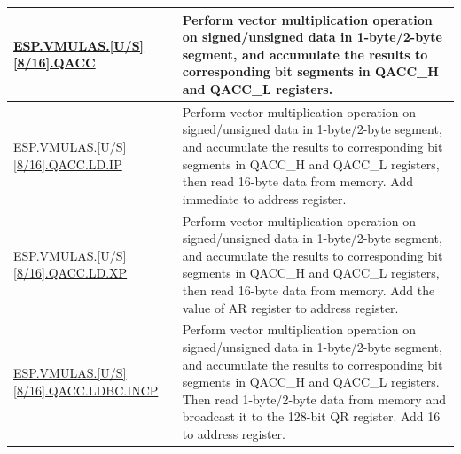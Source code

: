 \begin{longtable}[c]{|l|m{9cm}|}
    \hyperref[instruction:ESPVMULASU8QACC]{ESP.VMULAS.[U/S][8/16].QACC} & Perform vector multiplication operation on signed/unsigned data in 1-byte/2-byte segment, and accumulate the results to corresponding bit segments in QACC\_H and QACC\_L registers.
    \\\hline
    \hyperref[instruction:ESPVMULASU8QACCLDIP]{ESP.VMULAS.[U/S][8/16].QACC.LD.IP} & Perform vector multiplication operation on signed/unsigned data in 1-byte/2-byte segment, and accumulate the results to corresponding bit segments in QACC\_H and QACC\_L registers, then read 16-byte data from memory. Add immediate to address register.
    \\\hline
    \hyperref[instruction:ESPVMULASU8QACCLDXP]{ESP.VMULAS.[U/S][8/16].QACC.LD.XP} & Perform vector multiplication operation on signed/unsigned data in 1-byte/2-byte segment, and accumulate the results to corresponding bit segments in QACC\_H and QACC\_L registers, then read 16-byte data from memory. Add the value of AR register to address register.
    \\\hline
    \hyperref[instruction:ESPVMULASU8QACCLDBCINCP]{ESP.VMULAS.[U/S][8/16].QACC.LDBC.INCP} & Perform vector multiplication operation on signed/unsigned data in 1-byte/2-byte segment, and accumulate the results to corresponding bit segments in QACC\_H and QACC\_L registers. Then read 1-byte/2-byte data from memory and broadcast it to the 128-bit QR register. Add 16 to address register.
    \\\hline
\end{longtable}
